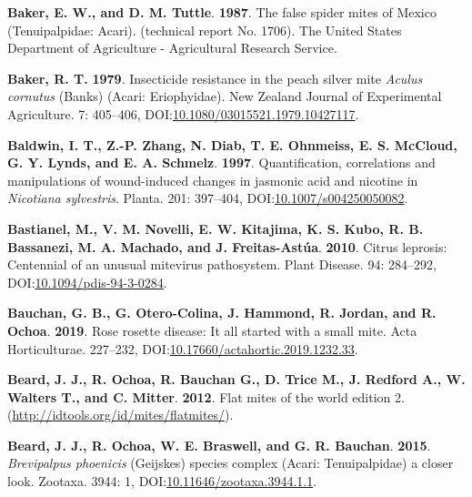 \documentclass[12pt,final,CPage]{ufthesis}
\newlength{\cslhangindent}
\newenvironment{CSLReferences}[2] %
{%
	\setlength{\parindent}{0pt}
	\ifodd #1 \everypar{\setlength{\hangindent}{\cslhangindent}}\ignorespaces\fi
	\ifnum #2 > 0
	\setlength{\parskip}{#2\baselineskip}
	\fi
}%
{}
\begin{document}
{\begin{CSLReferences}{1}{0}
  \leavevmode{}%
  \textbf{Baker, E. W., and D. M. Tuttle}. \textbf{1987}. The false spider mites of {Mexico} ({Tenuipalpidae}: {Acari}). (technical report No. 1706). The {United States} Department of Agriculture - Agricultural Research Service.

  \leavevmode{}%
  \textbf{Baker, R. T.} \textbf{1979}. Insecticide resistance in the peach silver mite {\emph{Aculus cornutus}} {(Banks)} ({Acari}: {Eriophyidae}). New Zealand Journal of Experimental Agriculture. 7: 405--406, DOI:\href{https://doi.org/10.1080/03015521.1979.10427117}{10.1080/03015521.1979.10427117}.

  \leavevmode{}%
  \textbf{Baldwin, I. T., Z.-P. Zhang, N. Diab, T. E. Ohnmeiss, E. S. McCloud, G. Y. Lynds, and E. A. Schmelz}. \textbf{1997}. Quantification, correlations and manipulations of wound-induced changes in jasmonic acid and nicotine in {\emph{Nicotiana sylvestris}}. Planta. 201: 397--404, DOI:\href{https://doi.org/10.1007/s004250050082}{10.1007/s004250050082}.

  \leavevmode{}%
  \textbf{Bastianel, M., V. M. Novelli, E. W. Kitajima, K. S. Kubo, R. B. Bassanezi, M. A. Machado, and J. Freitas-Astúa}. \textbf{2010}. {Citrus leprosis}: Centennial of an unusual mite{\textendash}virus pathosystem. Plant Disease. 94: 284--292, DOI:\href{https://doi.org/10.1094/pdis-94-3-0284}{10.1094/pdis-94-3-0284}.

  \leavevmode{}%
  \textbf{Bauchan, G. B., G. Otero-Colina, J. Hammond, R. Jordan, and R. Ochoa}. \textbf{2019}. {Rose rosette disease}: It all started with a small mite. Acta Horticulturae. 227--232, DOI:\href{https://doi.org/10.17660/actahortic.2019.1232.33}{10.17660/actahortic.2019.1232.33}.

  \leavevmode{}%
  \textbf{Beard, J. J., R. Ochoa, R. Bauchan G., D. Trice M., J. Redford A., W. Walters T., and C. Mitter}. \textbf{2012}. Flat mites of the world edition 2. (\url{http://idtools.org/id/mites/flatmites/}).

  \leavevmode{}%
  \textbf{Beard, J. J., R. Ochoa, W. E. Braswell, and G. R. Bauchan}. \textbf{2015}. {\emph{Brevipalpus phoenicis}} {(Geijskes)} species complex ({Acari}: {Tenuipalpidae}) \textemdash a closer look. Zootaxa. 3944: 1, DOI:\href{https://doi.org/10.11646/zootaxa.3944.1.1}{10.11646/zootaxa.3944.1.1}.


\end{CSLReferences}}
\end{document}
